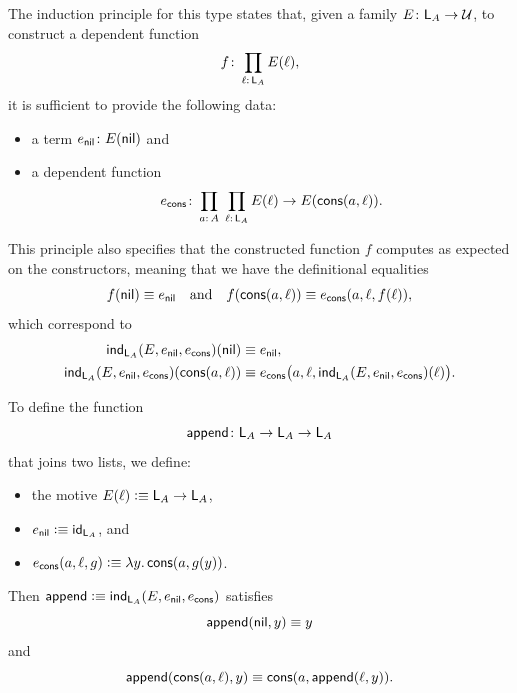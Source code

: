 The induction principle for this type states that, given a family $E\colon\fun L_A\to\univ$, to construct a dependent function
\[
    f\colon\prod_{\ell\colon\fun L_A}E(\ell),
\]
it is sufficient to provide the following data:
\begin{itemize}
    \item{}\label{itm:list-induction} a term $e_{\fun{nil}}\colon E(\fun{nil})$ and
    \item a dependent function
    \[
        e_{\fun{cons}}\colon
            \prod_{a\colon A}\;
            \prod_{\ell\colon\fun L_A}
                E(\ell)\to E(\fun{cons}(a,\ell)).
    \]
\end{itemize}
This principle also specifies that the constructed function $f$ computes as expected on the constructors, meaning that we have the definitional equalities
\begin{equation}\label{eq:list-recurrences}
    f(\mathsf{nil})\equiv e_{\mathsf{nil}}
    \quad\text{and}\quad
    f(\mathsf{cons}(a,\ell))
        \equiv e_{\mathsf{cons}}(a,\ell,f(\ell)),
\end{equation}
which correspond to
\begin{equation}\label{eq:List-computation-rules}
    \begin{aligned}
        \mathsf{ind}_{\mathsf{L}_A}
            (
                E,
                e_{\mathsf{nil}},
                e_{\mathsf{cons}}
            )(\mathsf{nil})
            &\equiv e_{\mathsf{nil}},\\
        \mathsf{ind}_{\mathsf{L}_A}
            (
                E,
                e_{\mathsf{nil}},
                e_{\mathsf{cons}}
            )(\mathsf{cons}(a,\ell))
            &\equiv e_{\mathsf{cons}}
                \bigl(
                    a,
                    \ell,
                    \mathsf{ind}_{\mathsf{L}_A}
                        (
                            E,
                            e_{\mathsf{nil}},
                            e_{\mathsf{cons}}
                        )(\ell)
                \bigr
            ).
    \end{aligned}
\end{equation}

\begin{xmpl}\label{xmpl:list-append}
    To define the function
    \[
        \fun{append}\colon\fun L_A\to\fun L_A\to\fun L_A
    \]
    that joins two lists, we define:
    \begin{itemize}
        \item the motive $E(\ell)\mathrel{\vcentcolon}\equiv\mathsf{L}_A\to\mathsf{L}_A$,
        \item $e_{\mathsf{nil}}\mathrel{\vcentcolon}\equiv\mathsf{id}_{\mathsf{L}_A}$, and
        \item $e_{\mathsf{cons}}(a,\ell,g)\mathrel{\vcentcolon}\equiv\lambda y.\,\mathsf{cons}(a,g(y))$.
    \end{itemize}
    Then $\mathsf{append}\mathrel{\vcentcolon}\equiv\mathsf{ind}_{\mathsf{L}_A}(E,e_{\mathsf{nil}},e_{\mathsf{cons}})$ satisfies
    \[
        \mathsf{append}(\mathsf{nil},y)\equiv y
    \]
    and
    \[
        \mathsf{append}(\mathsf{cons}(a,\ell),y)
        \equiv
        \mathsf{cons}(a,\mathsf{append}(\ell,y)).
    \]
\end{xmpl}

